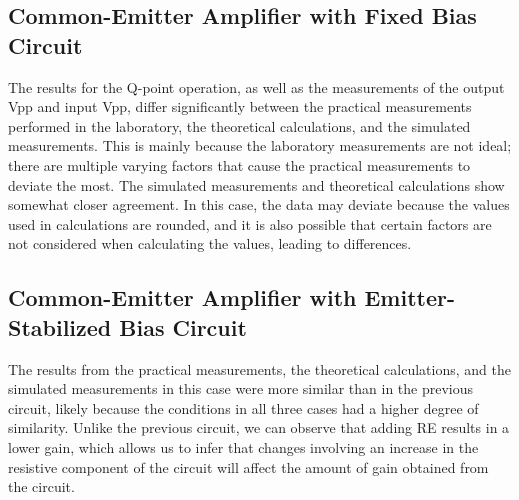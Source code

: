 \subsection{Common-Emitter Amplifier with Fixed Bias Circuit}
The results for the Q-point operation, as well as the measurements of the output Vpp and input Vpp, 
differ significantly between the practical measurements performed in the laboratory, the theoretical 
calculations, and the simulated measurements. This is mainly because the laboratory measurements are not 
ideal; there are multiple varying factors that cause the practical measurements to deviate the most. The 
simulated measurements and theoretical calculations show somewhat closer agreement. In this case, the data 
may deviate because the values used in calculations are rounded, and it is also possible that certain 
factors are not considered when calculating the values, leading to differences.

\subsection{Common-Emitter Amplifier with Emitter-Stabilized Bias Circuit}
The results from the practical measurements, the theoretical calculations, and the simulated measurements 
in this case were more similar than in the previous circuit, likely because the conditions in all three 
cases had a higher degree of similarity. Unlike the previous circuit, we can observe that adding RE 
results in a lower gain, which allows us to infer that changes involving an increase in the resistive 
component of the circuit will affect the amount of gain obtained from the circuit.